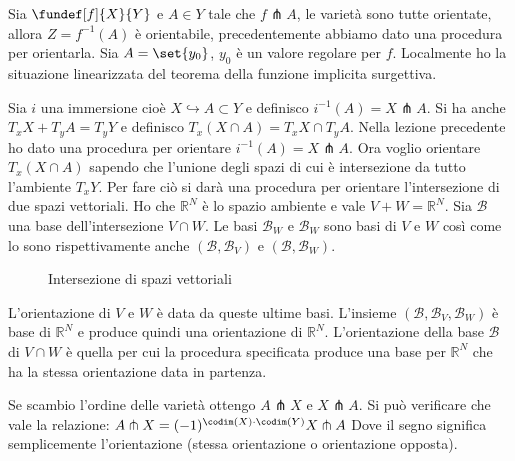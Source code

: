 

Sia $\fundef[f]{X}{Y}$ e $A \in Y$ tale che $f \pitchfork A$, le varietà sono tutte orientate, allora $Z = f^{-1}(A)$ è orientabile, precedentemente abbiamo dato una procedura per orientarla.
Sia $A = \set{y_0}$, $y_0$ è un valore regolare per $f$. Localmente ho la situazione linearizzata del teorema della funzione implicita surgettiva.


\newcommand*\base{\mathcal B}

Sia $i$ una immersione cioè $X \hookrightarrow A \subset Y$ e definisco $i^{-1} (A) = X \pitchfork A$. Si ha anche $T_{x}X + T_{y}A = T_{y}Y$ e definisco $T_{x}(X \cap A) = T_{x}X \cap T_{y}A$. 
Nella lezione precedente ho dato una procedura per orientare $i^{-1} (A) = X \pitchfork A$. Ora voglio orientare  $T_{x}(X \cap A)$ sapendo che l'unione degli spazi di cui è intersezione da tutto l'ambiente $T_{x}Y$. Per fare ciò si darà una procedura per orientare l'intersezione di due spazi vettoriali.
Ho che $\mathbb{R}^{N}$ è lo spazio ambiente e vale $V+W = \mathbb{R}^{N}$. Sia $\base$ una base dell'intersezione $V \cap W $. Le basi $\base_{W}$ e $\base_{W}$ sono basi di $V$ e $W$ così come lo sono rispettivamente anche $(\base, \base_{V})$ e  $(\base, \base_{W})$.

\begin{figure}
    \centering %
    
    \caption{Intersezione di spazi vettoriali}
\end{figure}

L'orientazione di $V$ e $W$ è data da queste ultime basi. L'insieme $(\base, \base_V, \base_W)$ è base di $\mathbb{R}^{N}$ e produce quindi una orientazione di $\mathbb{R}^{N}$.
L'orientazione della base $\base$ di $V \cap W$ è quella per cui la procedura specificata produce una base per $\mathbb{R}^{N}$ che ha la stessa orientazione data in partenza.


\begin{oss}
 Se scambio l'ordine delle varietà ottengo $A \pitchfork X$ e $X \pitchfork A$. Si può verificare che vale la relazione: $ A \pitchfork X = (-1)^{\codim(X) \cdot \codim(Y)} X \pitchfork A$
 Dove il segno significa semplicemente l'orientazione (stessa orientazione o orientazione opposta).
\end{oss}

